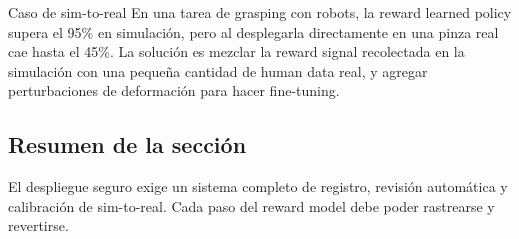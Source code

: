 \begin{knowledgebox}{Caso de sim-to-real}
En una tarea de grasping con robots, la reward learned policy supera el 95\% en simulación, pero al desplegarla directamente en una pinza real cae hasta el 45\%. La solución es mezclar la reward signal recolectada en la simulación con una pequeña cantidad de human data real, y agregar perturbaciones de deformación para hacer fine-tuning.
\end{knowledgebox}

\subsection{Resumen de la sección}

El despliegue seguro exige un sistema completo de registro, revisión automática y calibración de sim-to-real. Cada paso del reward model debe poder rastrearse y revertirse.

